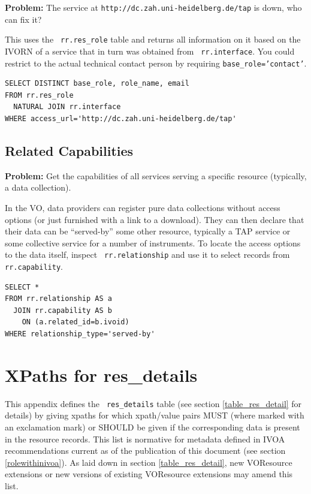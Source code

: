 \documentclass[11pt,a4paper]{ivoa}
\newcommand{\rtent}[1]{\texttt{\color{rtcolor} #1}}
\begin{document}
\textbf{Problem:} The service at
\texttt{http://dc.zah.uni-heidelberg.de/tap} is down, who can
fix it?

This uses the \rtent{rr.res\_role} table and returns all information on
it based on the IVORN of a service that in turn was obtained from
\rtent{rr.interface}.  You could restrict to the actual technical
contact person by requiring \texttt{base\_role='contact'}.


\begin{verbatim}
SELECT DISTINCT base_role, role_name, email 
FROM rr.res_role 
  NATURAL JOIN rr.interface 
WHERE access_url='http://dc.zah.uni-heidelberg.de/tap'
\end{verbatim}

\subsection{Related Capabilities}

\textbf{Problem:} Get the capabilities of all services serving a
specific resource (typically, a data collection).

In the VO, data providers can register pure data collections without
access options (or just furnished with a link to a download).  They can
then declare that their data can be ``served-by'' some other resource,
typically a TAP service or some collective service for a number of
instruments.  To locate the access options to the data itself, inspect
\rtent{rr.relationship} and use it to select records
from 
\rtent{rr.capability}.

\begin{verbatim}
SELECT * 
FROM rr.relationship AS a
  JOIN rr.capability AS b 
    ON (a.related_id=b.ivoid) 
WHERE relationship_type='served-by'
\end{verbatim}




\appendix

\section{XPaths for res\_details}

\label{d_u_list}

This appendix defines the \rtent{res\_details}
table (see section \ref{table_res_detail} for
details) by giving
xpaths for which xpath/value pairs MUST (where marked with an
exclamation mark) or SHOULD be given if the
corresponding data is present in the resource records.  This list is
normative for metadata defined in IVOA recommendations current as of the
publication of this document (see section \ref{rolewithinivoa}).  
As laid down in section \ref{table_res_detail}, 
new VOResource extensions or new
versions of existing VOResource extensions may amend this list.
\end{document}

